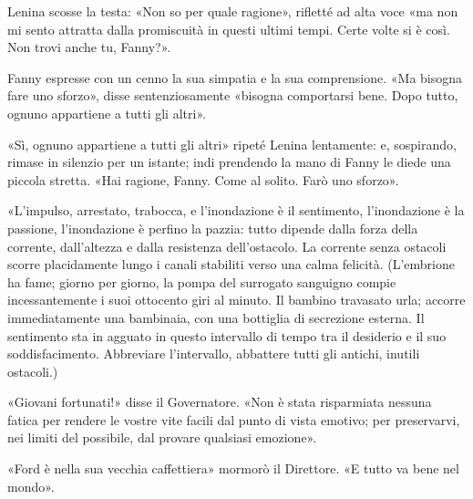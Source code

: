 \documentclass[
a5paper, %
10pt, %
twoside, 
onecolumn, %
openany, %
]{memoir}
\renewenvironment{shaded}{%
  \def\FrameCommand{\fboxsep=\FrameSep \colorbox{shadecolor}}%
  \MakeFramed{\advance\hsize-\width \FrameRestore\FrameRestore}}%
 {\endMakeFramed}
\begin{document}
\begin{shaded}
    Lenina scosse la testa: «Non so per quale ragione», rifletté ad alta voce «ma non mi sento attratta dalla promiscuità in questi ultimi tempi. Certe volte si è così. Non trovi anche tu, Fanny?».

Fanny espresse con un cenno la sua simpatia e la sua comprensione. «Ma bisogna fare uno sforzo», disse sentenziosamente «bisogna comportarsi bene. Dopo tutto, ognuno appartiene a tutti gli altri».

«Sì, ognuno appartiene a tutti gli altri» ripeté Lenina lentamente: e, sospirando, rimase in silenzio per un istante; indi prendendo la mano di Fanny le diede una piccola stretta. «Hai ragione, Fanny. Come al solito. Farò uno sforzo».
\end{shaded}

«L’impulso, arrestato, trabocca, e l’inondazione è il sentimento, l’inondazione è la passione, l’inondazione è perfino la pazzia: tutto dipende dalla forza della corrente, dall’altezza e dalla resistenza dell’ostacolo. La corrente senza ostacoli scorre placidamente lungo i canali stabiliti verso una calma felicità. (L’embrione ha fame; giorno per giorno, la pompa del surrogato sanguigno compie incessantemente i suoi ottocento giri al minuto. Il bambino travasato urla; accorre immediatamente una bambinaia, con una bottiglia di secrezione esterna. Il sentimento sta in agguato in questo intervallo di tempo tra il desiderio e il suo soddisfacimento. Abbreviare l’intervallo, abbattere tutti gli antichi, inutili ostacoli.)

«Giovani fortunati!» disse il Governatore. «Non è stata risparmiata nessuna fatica per rendere le vostre vite facili dal punto di vista emotivo; per preservarvi, nei limiti del possibile, dal provare qualsiasi emozione».

«Ford è nella sua vecchia caffettiera» mormorò il Direttore. «E tutto va bene nel mondo».
\end{document}
